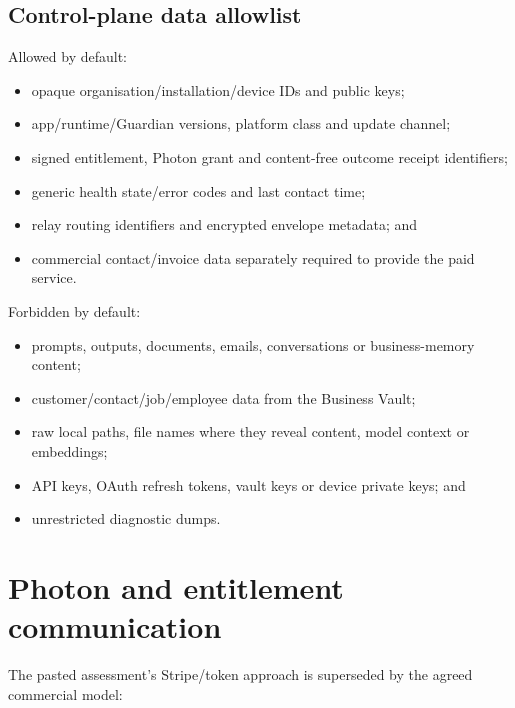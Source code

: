\documentclass[11pt]{article}
\begin{document}
\subsection{Control-plane data allowlist}

Allowed by default:

\begin{itemize}
  \item opaque organisation/installation/device IDs and public keys;
  \item app/runtime/Guardian versions, platform class and update channel;
  \item signed entitlement, Photon grant and content-free outcome receipt identifiers;
  \item generic health state/error codes and last contact time;
  \item relay routing identifiers and encrypted envelope metadata; and
  \item commercial contact/invoice data separately required to provide the paid service.
\end{itemize}

Forbidden by default:

\begin{itemize}
  \item prompts, outputs, documents, emails, conversations or business-memory content;
  \item customer/contact/job/employee data from the Business Vault;
  \item raw local paths, file names where they reveal content, model context or embeddings;
  \item API keys, OAuth refresh tokens, vault keys or device private keys; and
  \item unrestricted diagnostic dumps.
\end{itemize}

\section{Photon and entitlement communication}

The pasted assessment's Stripe/token approach is superseded by the agreed commercial model:
\end{document}
